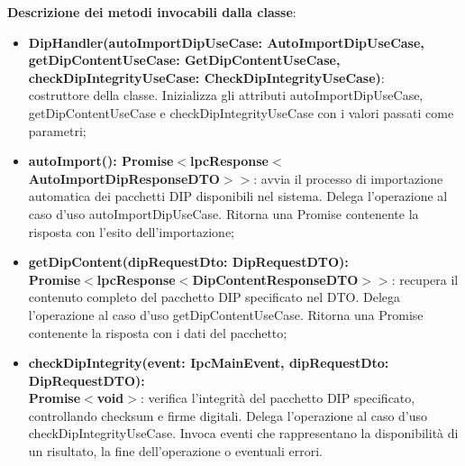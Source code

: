 \documentclass[a4paper,12pt]{article}
\begin{document}
{{{                \noindent \textbf{Descrizione dei metodi invocabili dalla classe}:
                \begin{itemize}
                    \item \textbf{DipHandler(autoImportDipUseCase: AutoImportDipUseCase,\\ getDipContentUseCase: GetDipContentUseCase,\\ checkDipIntegrityUseCase: CheckDipIntegrityUseCase)}:\\ costruttore della classe. Inizializza gli attributi autoImportDipUseCase, getDipContentUseCase e checkDipIntegrityUseCase con i valori passati come parametri;
                    \item \textbf{autoImport(): Promise$<$lpcResponse$<$AutoImportDipResponseDTO$>>$}: avvia il processo di importazione automatica dei pacchetti DIP disponibili nel sistema. Delega l'operazione al caso d'uso autoImportDipUseCase. Ritorna una Promise contenente la risposta con l'esito dell'importazione;
                    \item \textbf{getDipContent(dipRequestDto: DipRequestDTO):\\ Promise$<$lpcResponse$<$DipContentResponseDTO$>>$}: recupera il contenuto completo del pacchetto DIP specificato nel DTO. Delega l'operazione al caso d'uso getDipContentUseCase. Ritorna una Promise contenente la risposta con i dati del pacchetto;
                    \item \textbf{checkDipIntegrity(event: IpcMainEvent, dipRequestDto: DipRequestDTO):\\ Promise$<$void$>$}: verifica l'integrità del pacchetto DIP specificato, controllando checksum e firme digitali. Delega l'operazione al caso d'uso checkDipIntegrityUseCase. Invoca eventi che rappresentano la disponibilità di un risultato, la fine dell'operazione o eventuali errori.
                \end{itemize}

}}}
\end{document}
